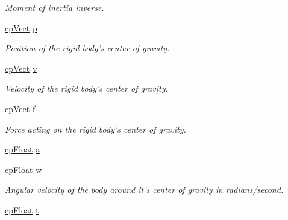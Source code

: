 \begin{DoxyCompactItemize}
\begin{DoxyCompactList}\small\item\em Moment of inertia inverse. \end{DoxyCompactList}\item 
\hypertarget{structcp_body_a2d66ed5ba3aa8fe5ec90371ad6aa5f59}{\hyperlink{structcp_vect}{cp\-Vect} \hyperlink{structcp_body_a2d66ed5ba3aa8fe5ec90371ad6aa5f59}{p}}\label{structcp_body_a2d66ed5ba3aa8fe5ec90371ad6aa5f59}

\begin{DoxyCompactList}\small\item\em Position of the rigid body's center of gravity. \end{DoxyCompactList}\item 
\hypertarget{structcp_body_a7d98e994ebcd10b12aa446ff9e5c67f1}{\hyperlink{structcp_vect}{cp\-Vect} \hyperlink{structcp_body_a7d98e994ebcd10b12aa446ff9e5c67f1}{v}}\label{structcp_body_a7d98e994ebcd10b12aa446ff9e5c67f1}

\begin{DoxyCompactList}\small\item\em Velocity of the rigid body's center of gravity. \end{DoxyCompactList}\item 
\hypertarget{structcp_body_adf7ea1cd2cc3840997e21d1b9baf3ee5}{\hyperlink{structcp_vect}{cp\-Vect} \hyperlink{structcp_body_adf7ea1cd2cc3840997e21d1b9baf3ee5}{f}}\label{structcp_body_adf7ea1cd2cc3840997e21d1b9baf3ee5}

\begin{DoxyCompactList}\small\item\em Force acting on the rigid body's center of gravity. \end{DoxyCompactList}\item 
\hyperlink{group__basic_types_gac1ed65573e035bf892505768c852d8d3}{cp\-Float} \hyperlink{structcp_body_a93996dfeb1565b8433b7d96773f7300c}{a}
\item 
\hypertarget{structcp_body_af7baaa8708ea16122bf226a2cb1a0bb1}{\hyperlink{group__basic_types_gac1ed65573e035bf892505768c852d8d3}{cp\-Float} \hyperlink{structcp_body_af7baaa8708ea16122bf226a2cb1a0bb1}{w}}\label{structcp_body_af7baaa8708ea16122bf226a2cb1a0bb1}

\begin{DoxyCompactList}\small\item\em Angular velocity of the body around it's center of gravity in radians/second. \end{DoxyCompactList}\item 
\hypertarget{structcp_body_a171f5a752bb920e036bba0b2a0b8b4fe}{\hyperlink{group__basic_types_gac1ed65573e035bf892505768c852d8d3}{cp\-Float} \hyperlink{structcp_body_a171f5a752bb920e036bba0b2a0b8b4fe}{t}}\label{structcp_body_a171f5a752bb920e036bba0b2a0b8b4fe}


\end{DoxyCompactItemize}
